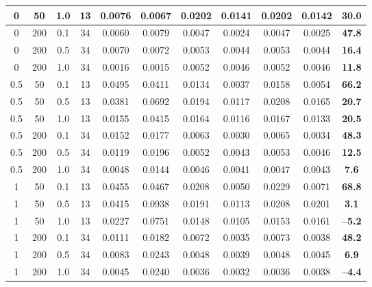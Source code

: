 \begin{table}[ht!]
\begin{tabular}{ccccccccccc}
0 & 50 & 1.0 & 13 & 0.0076 & 0.0067 & 0.0202 & 0.0141 & 0.0202 & 0.0142 & \textbf{30.0} \\
\hline
0 & 200 & 0.1 & 34 & 0.0060 & 0.0079 & 0.0047 & 0.0024 & 0.0047 & 0.0025 & \textbf{47.8} \\
0 & 200 & 0.5 & 34 & 0.0070 & 0.0072 & 0.0053 & 0.0044 & 0.0053 & 0.0044 & \textbf{16.4} \\
0 & 200 & 1.0 & 34 & 0.0016 & 0.0015 & 0.0052 & 0.0046 & 0.0052 & 0.0046 & \textbf{11.8} \\
\hline\hline
0.5 & 50 & 0.1 & 13 & 0.0495 & 0.0411 & 0.0134 & 0.0037 & 0.0158 & 0.0054 & \textbf{66.2} \\
0.5 & 50 & 0.5 & 13 & 0.0381 & 0.0692 & 0.0194 & 0.0117 & 0.0208 & 0.0165 & \textbf{20.7} \\
0.5 & 50 & 1.0 & 13 & 0.0155 & 0.0415 & 0.0164 & 0.0116 & 0.0167 & 0.0133 & \textbf{20.5} \\
\hline
0.5 & 200 & 0.1 & 34 & 0.0152 & 0.0177 & 0.0063 & 0.0030 & 0.0065 & 0.0034 & \textbf{48.3} \\
0.5 & 200 & 0.5 & 34 & 0.0119 & 0.0196 & 0.0052 & 0.0043 & 0.0053 & 0.0046 & \textbf{12.5} \\
0.5 & 200 & 1.0 & 34 & 0.0048 & 0.0144 & 0.0046 & 0.0041 & 0.0047 & 0.0043 & \textbf{7.6} \\
\hline\hline
1 & 50 & 0.1 & 13 & 0.0455 & 0.0467 & 0.0208 & 0.0050 & 0.0229 & 0.0071 & \textbf{68.8} \\
1 & 50 & 0.5 & 13 & 0.0415 & 0.0938 & 0.0191 & 0.0113 & 0.0208 & 0.0201 & \textbf{3.1} \\
1 & 50 & 1.0 & 13 & 0.0227 & 0.0751 & 0.0148 & 0.0105 & 0.0153 & 0.0161 & \textbf{--5.2} \\
\hline
1 & 200 & 0.1 & 34 & 0.0111 & 0.0182 & 0.0072 & 0.0035 & 0.0073 & 0.0038 & \textbf{48.2} \\
1 & 200 & 0.5 & 34 & 0.0083 & 0.0243 & 0.0048 & 0.0039 & 0.0048 & 0.0045 & \textbf{6.9} \\
1 & 200 & 1.0 & 34 & 0.0045 & 0.0240 & 0.0036 & 0.0032 & 0.0036 & 0.0038 & \textbf{--4.4} \\
\hline\hline
\end{tabular}
\end{table}
